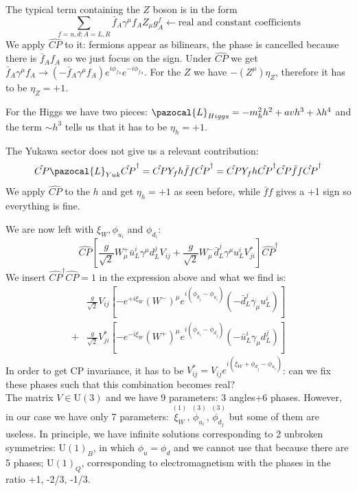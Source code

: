 \documentclass[../main.tex]{subfiles}
\begin{document}
The typical term containing the $Z$ boson is in the form
\[
\sum_{f=u,d;A=L,R}\bar{f}_A\gamma^\mu f_AZ_\mu g_A^f\xleftarrow[]{}\text{real and constant coefficients}
\]
We apply $\hat{CP}$ to it: fermions appear as bilinears, the phase is cancelled because there is $\bar{f}_Af_A$ so we just focus on the sign. Under $\hat{CP}$ we get $\bar{f}_A\gamma^\mu f_A\xrightarrow[]{}(-\bar{f}_A\gamma^\mu f_A)e^{i\phi_{f_A}}e^{-i\phi_{f_A}}$. For the $Z$ we have $-(Z^\mu)\eta_Z$, therefore it has to be $\eta_Z=+1$. 

For the Higgs we have two pieces: $\pazocal{L}_{Higgs}=-m_h^2h^2+avh^3+\lambda h^4$ and the term $\sim h^3$ tells us that it has to be $\eta_h=+1$. 

The Yukawa sector does not give us a relevant contribution:
\[
\hat{CP}\pazocal{L}_{Yuk}\hat{CP}^\dagger=\hat{CP}Y_fh\bar{f}f\hat{CP}^\dagger=\hat{CP}Y_fh\hat{CP}^\dagger\hat{CP}\bar{f}f\hat{CP}^\dagger
\]
We apply $\hat{CP}$ to the $h$ and get $\eta_h=+1$ as seen before, while $\bar{f}f$ gives a +1 sign so everything is fine.

We are now left with $\xi_W, \phi_{u_i}$ and $\phi_{d_i}$:
\[
\hat{CP}\left[\frac{g}{\sqrt{2}}W_\mu^+\bar{u}_L^i\gamma^\mu d^j_LV_{ij}+\frac{g}{\sqrt{2}}W_\mu^-\bar{d}_L^j\gamma^\mu u_L^iV_{ji}^*\right]\hat{CP}^\dagger
\]
We insert $\hat{CP}^\dagger\hat{CP}=1$ in the expression above and what we find is:
\begin{align*}
&\frac{g}{\sqrt{2}}V_{ij}\left[-e^{+i\xi_W}(W^-)^\mu e^{i(\phi_{d_j}-\phi_{u_i})}\left(-\bar{d}_L^j\gamma_\mu u_L^i\right)\right]\\
+&\frac{g}{\sqrt{2}}V_{ji}^*\left[-e^{-i\xi_W}(W^+)^\mu e^{i(\phi_{u_i}-\phi_{d_j})}\left(-\bar{u}_L^i\gamma_\mu d_L^j\right)\right]
\end{align*}
In order to get CP invariance, it has to be $V_{ij}^*=V_{ij}e^{i(\xi_W+\phi_{d_j}-\phi_{u_i})}$: can we fix these phases such that this combination becomes real?\\
The matrix $V$$\in$U$(3)$ and we have 9 parameters: 3 angles+6 phases. However, in our case we have only 7 parameters: $\overset{(1)}{\xi_W}, \overset{(3)}{\phi_{u_i}}, \overset{(3)}{\phi_{d_j}}$ but some of them are useless. In principle, we have infinite solutions corresponding to 2 unbroken symmetries: U$(1)_B$, in which $\phi_u=\phi_d$ and we cannot use that because there are 5 phases; U$(1)_Q$, corresponding to electromagnetism with the phases in the ratio +1, -2/3, -1/3. 
\end{document}
